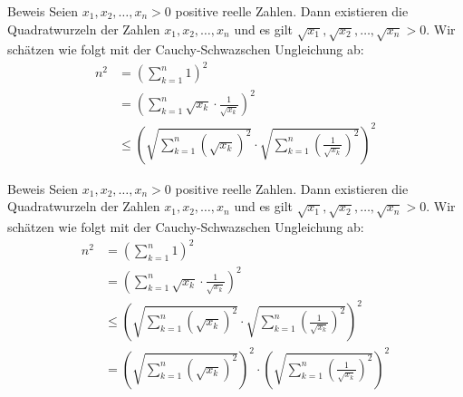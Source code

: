 \documentclass[10pt]{beamer}
\begin{document}
\begin{frame}{Beweis}
    Seien \( x_{1}, x_{2}, \ldots, x_{n} > 0 \) positive reelle Zahlen. Dann existieren die Quadratwurzeln der Zahlen \( x_{1}, x_{2}, \ldots, x_{n} \) und es gilt \( \sqrt{x_{1}}, \sqrt{x_{2}}, \ldots, \sqrt{x_{n}} > 0 \). Wir schätzen wie folgt mit der Cauchy-Schwazschen Ungleichung ab:
    \begin{align*}
        n^{2}
        & = \left( \sum_{k = 1}^{n} 1 \right)^{2} \\
        & = \left( \sum_{k = 1}^{n} \sqrt{x_{k}} \cdot \frac{1}{\sqrt{x_{k}}} \right)^{2} \\
        & \leq \left( \sqrt{\sum_{k = 1}^{n} \left( \sqrt{x_{k}} \right)^{2}} \cdot \sqrt{\sum_{k = 1}^{n} \left( \frac{1}{\sqrt{x_{k}}} \right)^{2}} \right)^{2}
    \end{align*}
\end{frame}



\begin{frame}{Beweis}
    Seien \( x_{1}, x_{2}, \ldots, x_{n} > 0 \) positive reelle Zahlen. Dann existieren die Quadratwurzeln der Zahlen \( x_{1}, x_{2}, \ldots, x_{n} \) und es gilt \( \sqrt{x_{1}}, \sqrt{x_{2}}, \ldots, \sqrt{x_{n}} > 0 \). Wir schätzen wie folgt mit der Cauchy-Schwazschen Ungleichung ab:
    \begin{align*}
        n^{2}
        & = \left( \sum_{k = 1}^{n} 1 \right)^{2} \\
        & = \left( \sum_{k = 1}^{n} \sqrt{x_{k}} \cdot \frac{1}{\sqrt{x_{k}}} \right)^{2} \\
        & \leq \left( \sqrt{\sum_{k = 1}^{n} \left( \sqrt{x_{k}} \right)^{2}} \cdot \sqrt{\sum_{k = 1}^{n} \left( \frac{1}{\sqrt{x_{k}}} \right)^{2}} \right)^{2} \\
        & = \left( \sqrt{\sum_{k = 1}^{n} \left( \sqrt{x_{k}} \right)^{2}} \right)^{2} \cdot \left( \sqrt{\sum_{k = 1}^{n} \left( \frac{1}{\sqrt{x_{k}}} \right)^{2}} \right)^{2}
    \end{align*}
\end{frame}
\end{document}
